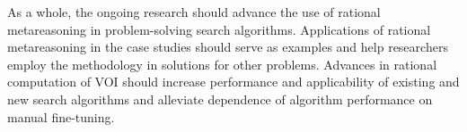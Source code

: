 As a whole, the ongoing research should advance the use of rational
metareasoning in problem-solving search algorithms. Applications of
rational metareasoning in the case studies should serve as examples
and help researchers employ the methodology in solutions for other
problems. Advances in rational computation of VOI should increase
performance and applicability of existing and new search algorithms
and alleviate dependence of algorithm performance on manual
fine-tuning.
